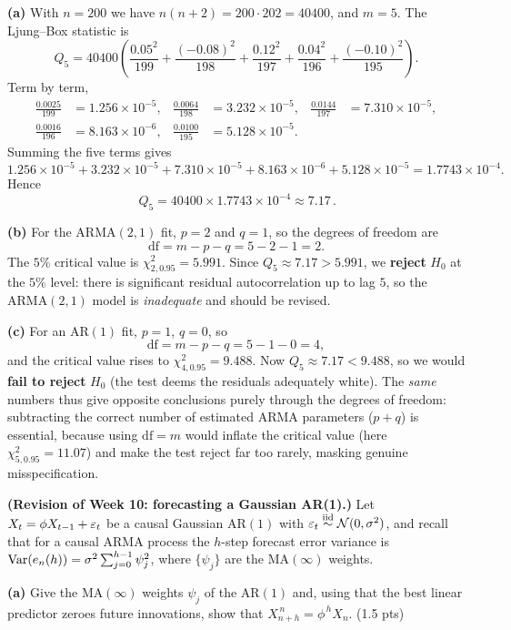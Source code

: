\documentclass[11pt]{article}
\begin{document}
\textbf{(a)} With $n=200$ we have $n(n+2)=200\cdot202=40400$, and $m=5$. The Ljung--Box statistic is
\[
Q_5=40400\left(\frac{0.05^2}{199}+\frac{(-0.08)^2}{198}
+\frac{0.12^2}{197}+\frac{0.04^2}{196}+\frac{(-0.10)^2}{195}\right).
\]
Term by term,
\[
\begin{aligned}
\frac{0.0025}{199}&=1.256\times10^{-5}, &
\frac{0.0064}{198}&=3.232\times10^{-5}, &
\frac{0.0144}{197}&=7.310\times10^{-5},\\[2pt]
\frac{0.0016}{196}&=8.163\times10^{-6}, &
\frac{0.0100}{195}&=5.128\times10^{-5}. & &
\end{aligned}
\]
Summing the five terms gives
\[
1.256\times10^{-5}+3.232\times10^{-5}+7.310\times10^{-5}+8.163\times10^{-6}+5.128\times10^{-5}
=1.7743\times10^{-4}.
\]
Hence
\[
\boxed{\,Q_5=40400\times1.7743\times10^{-4}\approx7.17\,}.
\]

\textbf{(b)} For the ARMA$(2,1)$ fit, $p=2$ and $q=1$, so the degrees of freedom are
\[
\mathrm{df}=m-p-q=5-2-1=2 .
\]
The $5\%$ critical value is $\chi^2_{2,0.95}=5.991$. Since $Q_5\approx7.17>5.991$, we \textbf{reject} $H_0$ at the $5\%$ level: there is significant residual autocorrelation up to lag $5$, so the ARMA$(2,1)$ model is \emph{inadequate} and should be revised.

\textbf{(c)} For an AR$(1)$ fit, $p=1$, $q=0$, so
\[
\mathrm{df}=m-p-q=5-1-0=4,
\]
and the critical value rises to $\chi^2_{4,0.95}=9.488$. Now $Q_5\approx7.17<9.488$, so we would \textbf{fail to reject} $H_0$ (the test deems the residuals adequately white). The \emph{same} numbers thus give opposite conclusions purely through the degrees of freedom: subtracting the correct number of estimated ARMA parameters ($p+q$) is essential, because using $\mathrm{df}=m$ would inflate the critical value (here $\chi^2_{5,0.95}=11.07$) and make the test reject far too rarely, masking genuine misspecification.

\statementstart
\textbf{(Revision of Week 10: forecasting a Gaussian AR(1).)} Let $X_t=\phi X_{t-1}+\varepsilon_t$ be a causal Gaussian AR$(1)$ with $\varepsilon_t\overset{\text{iid}}{\sim}\mathcal N(0,\sigma^2)$, and recall that for a causal ARMA process the $h$-step forecast error variance is $\operatorname{Var}(e_n(h))=\sigma^2\sum_{j=0}^{h-1}\psi_j^2$, where $\{\psi_j\}$ are the $\mathrm{MA}(\infty)$ weights.

\textbf{(a)} Give the $\mathrm{MA}(\infty)$ weights $\psi_j$ of the AR$(1)$ and, using that the best linear predictor zeroes future innovations, show that $X^{\,n}_{n+h}=\phi^{\,h}X_n$. \hfill(1.5 pts)
\end{document}

